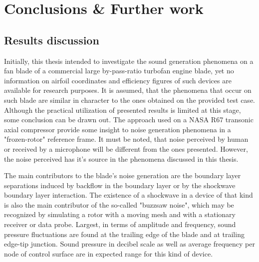 
\chapter{Conclusions \& Further work} %

\label{conclusions} %


\section{Results discussion}
Initially, this thesis intended to investigate the sound generation phenomena on a fan blade of a commercial large by-pass-ratio turbofan engine blade, yet no information on airfoil coordinates and efficiency figures of such devices are available for research purposes. It is assumed, that the phenomena that occur on such blade are similar in character to the ones obtained on the provided test case. Although the practical utilization of presented results is limited at this stage, some conclusion can be drawn out. The approach used on a NASA R67 transonic axial compressor provide some insight to noise generation phenomena in a "frozen-rotor" reference frame. It must be noted, that noise perceived by human or received by a microphone will be different from the ones presented. However, the noise perceived has it's source in the phenomena discussed in this thesis.

The main contributors to the blade's noise generation are the boundary layer separations induced by backflow in the boundary layer or by the shockwave boundary layer interaction. The existence of a shockwave in a device of that kind is also the main contributor of the so-called "buzzsaw noise", which may be recognized by simulating a rotor with a moving mesh and with a stationary receiver or data probe. Largest, in terms of amplitude and frequency, sound pressure fluctuations are found at the trailing edge of the blade and at trailing edge-tip junction. Sound pressure in decibel scale as well as average frequency per node of control surface are in expected range for this kind of device.

